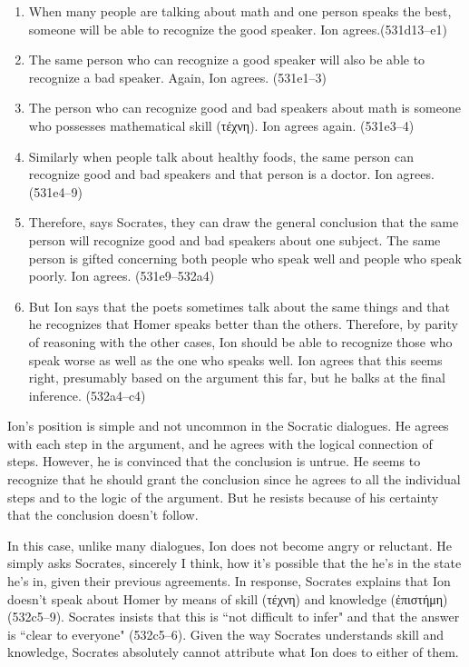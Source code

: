 \documentclass[11pt,letterpaper]{article}
\begin{document}
\begin{enumerate}

    \item When many people are talking about math and one person speaks the best, someone will be able to recognize the good speaker. Ion agrees.(531d13--e1)

    \item The same person who can recognize a good speaker will also be able to recognize a bad speaker. Again, Ion agrees. (531e1--3)

    \item The person who can recognize good and bad speakers about math is someone who possesses mathematical skill (\textgreek{τέχνη}). Ion agrees again. (531e3--4)

    \item Similarly when people talk about healthy foods, the same person can recognize good and bad speakers and that person is a doctor. Ion agrees. (531e4--9)

    \item Therefore, says Socrates, they can draw the general conclusion that the same person will recognize good and bad speakers about one subject. The same person is gifted concerning both people who speak well and people who speak poorly. Ion agrees. (531e9--532a4)

    \item But Ion says that the poets sometimes talk about the same things and that he recognizes that Homer speaks better than the others. Therefore, by parity of reasoning with the other cases, Ion should be able to recognize those who speak worse as well as the one who speaks well. Ion agrees that this seems right, presumably based on the argument this far, but he balks at the final inference. (532a4--c4)

\end{enumerate}

Ion's position is simple and not uncommon in the Socratic dialogues. He agrees with each step in the argument, and he agrees with the logical connection of steps. However, he is convinced that the conclusion is untrue. He seems to recognize that he should grant the conclusion since he agrees to all the individual steps and to the logic of the argument. But he resists because of his certainty that the conclusion doesn't follow.

In this case, unlike many dialogues, Ion does not become angry or reluctant. He simply asks Socrates, sincerely I think, how it's possible that the he's in the state he's in, given their previous agreements. In response, Socrates explains that Ion doesn't speak about Homer by means of skill (\textgreek{τέχνη}) and knowledge (\textgreek{ἐπιστήμη}) (532c5--9). Socrates insists that this is ``not difficult to infer" and that the answer is ``clear to everyone" (532c5--6). Given the way Socrates understands skill and knowledge, Socrates absolutely cannot attribute what Ion does to either of them.
\end{document}
